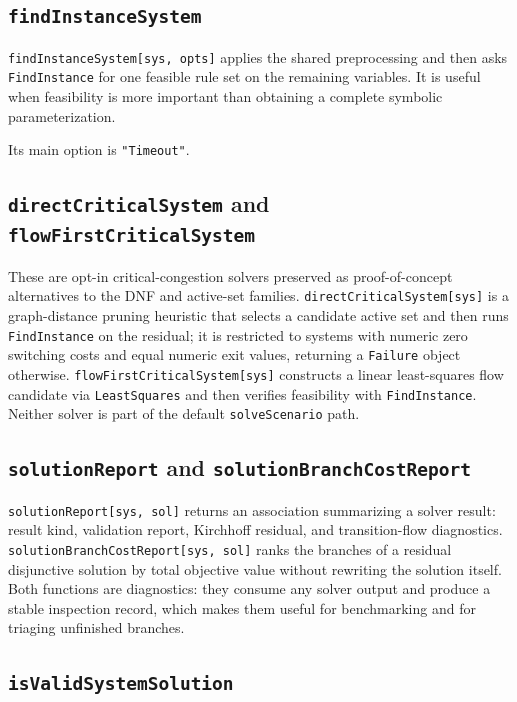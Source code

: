\documentclass[11pt]{article}
\begin{document}
\subsection*{\texttt{findInstanceSystem}}

\texttt{findInstanceSystem[sys, opts]} applies the shared preprocessing and then asks \texttt{FindInstance} for one feasible rule set on the remaining variables. It is useful when feasibility is more important than obtaining a complete symbolic parameterization.

Its main option is \texttt{"Timeout"}.

\subsection*{\texttt{directCriticalSystem} and \texttt{flowFirstCriticalSystem}}

These are opt-in critical-congestion solvers preserved as proof-of-concept alternatives to the DNF and active-set families. \texttt{directCriticalSystem[sys]} is a graph-distance pruning heuristic that selects a candidate active set and then runs \texttt{FindInstance} on the residual; it is restricted to systems with numeric zero switching costs and equal numeric exit values, returning a \texttt{Failure} object otherwise. \texttt{flowFirstCriticalSystem[sys]} constructs a linear least-squares flow candidate via \texttt{LeastSquares} and then verifies feasibility with \texttt{FindInstance}. Neither solver is part of the default \texttt{solveScenario} path.

\subsection*{\texttt{solutionReport} and \texttt{solutionBranchCostReport}}

\texttt{solutionReport[sys, sol]} returns an association summarizing a solver result: result kind, validation report, Kirchhoff residual, and transition-flow diagnostics. \texttt{solutionBranchCostReport[sys, sol]} ranks the branches of a residual disjunctive solution by total objective value without rewriting the solution itself. Both functions are diagnostics: they consume any solver output and produce a stable inspection record, which makes them useful for benchmarking and for triaging unfinished branches.

\subsection*{\texttt{isValidSystemSolution}}
\end{document}
